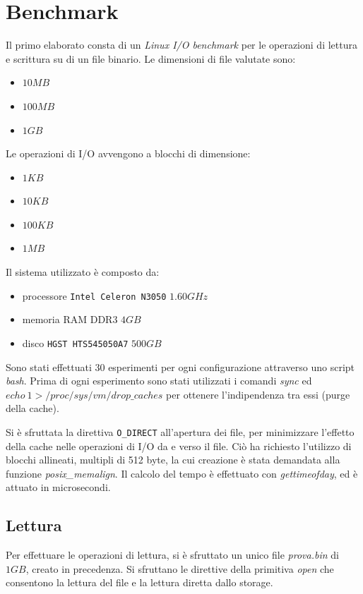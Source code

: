 \chapter{Benchmark}
Il primo elaborato consta di un \emph{Linux I/O benchmark} per le operazioni di lettura e scrittura su di un file binario. Le dimensioni di file valutate sono:
\begin{itemize}
	\item $10MB$
	\item $100MB$
	\item $1GB$
\end{itemize}
Le operazioni di I/O avvengono a blocchi di dimensione:
\begin{itemize}
	\item $1KB$
	\item $10KB$
	\item $100KB$
	\item $1MB$
\end{itemize}
Il sistema utilizzato è composto da:
\begin{itemize}
	\item processore \texttt{Intel Celeron N3050} $1.60GHz$
	\item memoria RAM DDR3 $4GB$
	\item disco \texttt{HGST HTS545050A7} $500GB$
\end{itemize}
Sono stati effettuati $30$ esperimenti per ogni configurazione attraverso uno script \emph{bash}. Prima di ogni esperimento sono stati utilizzati i comandi \emph{sync} ed $echo\ 1 > /proc/sys/vm/drop\_caches$ per ottenere l'indipendenza tra essi (purge della cache).\par 
Si è sfruttata la direttiva \texttt{O\_DIRECT} all'apertura dei file, per minimizzare l'effetto della cache nelle operazioni di I/O da e verso il file. Ciò ha richiesto l'utilizzo di blocchi allineati, multipli di 512 byte, la cui creazione è stata demandata alla funzione \emph{posix\_memalign}. Il calcolo del tempo è effettuato con \emph{gettimeofday}, ed è attuato in microsecondi.

	\section{Lettura}
		Per effettuare le operazioni di lettura, si è sfruttato un unico file \emph{prova.bin} di $1GB$, creato in precedenza. Si sfruttano le direttive della primitiva \emph{open} che consentono la lettura del file e la lettura diretta dallo storage.
		
	
